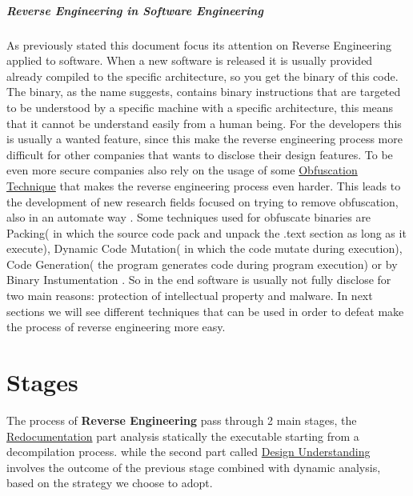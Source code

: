 \documentclass{article}
\begin{document}
\subparagraph{Reverse Engineering in Software Engineering}
As previously stated this document focus its attention on Reverse Engineering applied to software. When a new software is released it is usually provided already compiled to the specific architecture, so you get the binary of this code.
The binary, as the name suggests, contains binary instructions that are targeted to be understood by a specific machine with a specific architecture, this means that it cannot be understand easily from a human being.
For the developers this is usually a wanted feature, since this make the reverse engineering process more difficult for other companies that wants to disclose their design features.
To be even more secure companies also rely on the usage of some \underline{Obfuscation Technique} that makes the reverse engineering process even harder. This leads to the development of new research fields focused on trying to remove obfuscation, also in an automate way \citep{1566145}.
Some techniques used for obfuscate binaries are Packing( in which the source code pack and unpack the .text section as long as it execute)\citep{SlidePackers}, Dynamic Code Mutation( in which the code mutate during execution), Code Generation( the program generates code during program execution) or by Binary Instumentation \cite{paperInstrumentation}.
So in the end software is usually not fully disclose for two main reasons: protection of intellectual property and malware. In next sections we will see different techniques that can be used in order to defeat make the process of reverse engineering more easy.

\clearpage

\section{Stages} 
The process of \textbf{Reverse Engineering} pass through 2 main stages, the \underline{Redocumentation} part analysis statically the executable starting from a decompilation process.
while the second part called \underline{Design Understanding} involves the outcome of the previous stage combined with dynamic analysis, based on the strategy we choose to adopt. 
\end{document}
